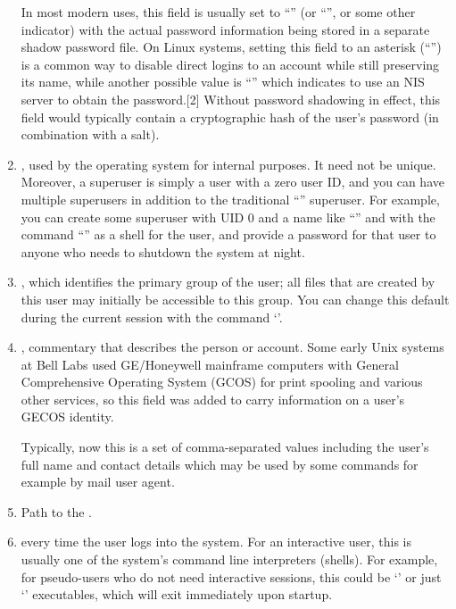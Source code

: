 \begin{enumerate}
      In most modern uses, this field is usually set to ``''
      (or ``\cmd{*}'', or some other indicator) with the actual password
      information being stored in a separate shadow password file. On Linux
      systems, setting this field to an asterisk (``\cmd{*}'') is a common way
      to disable direct logins to an account while still preserving its name,
      while another possible value is ``'' which indicates to use
      an NIS server to obtain the password.[2] Without password shadowing
      in effect, this field would typically contain a cryptographic hash of
      the user's password (in combination with a salt).
\item {}, used by the operating system for internal
      purposes. It need not be unique. Moreover, a superuser is simply a user
      with a zero user ID, and you can have multiple superusers in addition to
      the traditional ``'' superuser. For example, you can create
      some superuser with UID 0 and a name like ``'' and with
      the command ``'' as a shell for the user, and provide
      a password for that user to anyone who needs to shutdown the system
      at night.
\item {}, which identifies the primary group of
      the user; all files that are created by this user may initially be
      accessible to this group. You can change this default during
      the current session with the command `'.
\item {}, commentary that describes the person or account.
      Some early Unix systems at Bell Labs used GE/Honeywell mainframe
      computers with General Comprehensive Operating System (GCOS) for print
      spooling and various other services, so this field was added to carry
      information on a user's GECOS identity.

      Typically, now this is a set of comma-separated values including
      the user's full name and contact details which may be used by some
      commands for example by mail user agent.
\item Path to the .
\item {} every time the user logs into the system.
      For an interactive user, this is usually one of the system's command line
      interpreters (shells). For example, for pseudo-users who do not need
      interactive sessions, this could be `' or just `'
      executables, which will exit immediately upon startup.
\end{enumerate}

